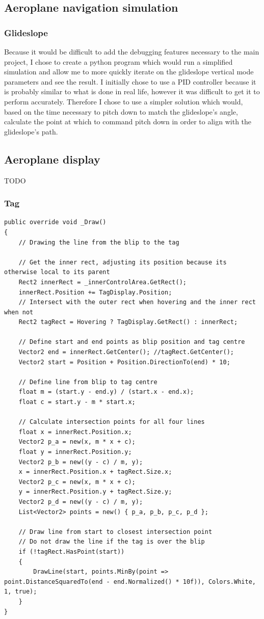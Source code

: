 \documentclass{article}
\begin{document}
\subsection{Aeroplane navigation simulation}
\subsubsection{Glideslope}
Because it would be difficult to add the debugging features necessary to the main project, I chose to create a python program which would run a simplified simulation and allow me to more quickly iterate on the glideslope vertical mode parameters and see the result.
I initially chose to use a PID controller\cite{pidcontroller} because it is probably similar to what is done in real life, however it was difficult to get it to perform accurately.
Therefore I chose to use a simpler solution which would, based on the time necessary to pitch down to match the glideslope's angle, calculate the point at which to command pitch down in order to align with the glideslope's path.


\subsection{Aeroplane display}
TODO
\subsubsection{Tag}
\lstset{style=csharp}
\begin{lstlisting}[caption=Drawing the tag line]
public override void _Draw()
{
    // Drawing the line from the blip to the tag

    // Get the inner rect, adjusting its position because its otherwise local to its parent
    Rect2 innerRect = _innerControlArea.GetRect();
    innerRect.Position += TagDisplay.Position;
    // Intersect with the outer rect when hovering and the inner rect when not
    Rect2 tagRect = Hovering ? TagDisplay.GetRect() : innerRect; 

    // Define start and end points as blip position and tag centre
    Vector2 end = innerRect.GetCenter(); //tagRect.GetCenter();
    Vector2 start = Position + Position.DirectionTo(end) * 10;

    // Define line from blip to tag centre
    float m = (start.y - end.y) / (start.x - end.x);
    float c = start.y - m * start.x;

    // Calculate intersection points for all four lines
    float x = innerRect.Position.x;
    Vector2 p_a = new(x, m * x + c);
    float y = innerRect.Position.y;
    Vector2 p_b = new((y - c) / m, y);
    x = innerRect.Position.x + tagRect.Size.x;
    Vector2 p_c = new(x, m * x + c);
    y = innerRect.Position.y + tagRect.Size.y;
    Vector2 p_d = new((y - c) / m, y);
    List<Vector2> points = new() { p_a, p_b, p_c, p_d };

    // Draw line from start to closest intersection point
    // Do not draw the line if the tag is over the blip
    if (!tagRect.HasPoint(start))
    {
        DrawLine(start, points.MinBy(point => point.DistanceSquaredTo(end - end.Normalized() * 10f)), Colors.White, 1, true);
    }
}
\end{lstlisting}
\end{document}
